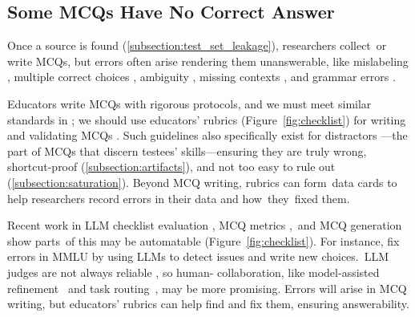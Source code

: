 \subsection{Some MCQs Have No Correct Answer} \label{subsection:quality}

Once a source is found (\cref{subsection:test_set_leakage}), researchers collect~or write MCQs, but errors often arise rendering them unanswerable, like mislabeling \cite{explained2023smart}, multiple correct choices \cite{Palta2024PlausiblyPQ}, ambiguity \cite{gema2024we}, missing contexts \cite{wang2024mmlu}, and grammar errors \cite{chen2023hellaswag}.

Educators write MCQs with rigorous protocols, and we must meet similar standards in  \cite{boyd2019question}; we should use educators' rubrics (Figure~\ref{fig:checklist}) for writing and validating MCQs \cite{haladyna1989taxonomy}.
Such guidelines also specifically exist for distractors \cite{haladyna2002review}---the part of MCQs that discern testees' skills---ensuring they are truly wrong, shortcut-proof (\cref{subsection:artifacts}), and not too easy to rule out (\cref{subsection:saturation}).
Beyond MCQ writing, rubrics can form~data cards \cite{pushkarna2022data} to help researchers record errors in their data and how~they~fixed them.

Recent work in LLM checklist evaluation \cite{cook2024ticking}, 
MCQ metrics \cite{moon2022evaluating},~and MCQ generation \cite{sileo2023generating} show parts~of this may be
automatable (Figure~\ref{fig:checklist}).
For instance, \citet{wang2024mmlu} fix errors in MMLU by using LLMs to detect issues and
write new choices.~LLM judges are not always reliable \cite{xu-etal-2024-pride}, so
human- collaboration, like model-assisted
refinement~\cite{shankar2024validates} and task
routing~\cite{miranda2024hybrid}, may be more promising.
%
Errors will arise in MCQ writing, but educators' rubrics can help
find and fix them, ensuring answerability.


